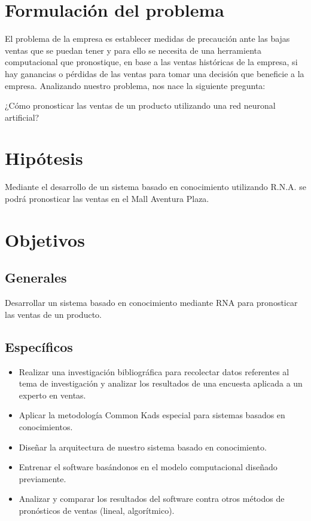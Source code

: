 \section{Formulación del problema}
El problema de la empresa es establecer medidas de precaución ante las bajas ventas que se puedan tener y para ello se necesita de una herramienta computacional que pronostique, en base a las ventas históricas de la empresa, si hay ganancias o pérdidas de las ventas para tomar una decisión que beneficie a la empresa. Analizando nuestro problema, nos nace la siguiente pregunta:
 
 \begin{center} 
     ¿Cómo pronosticar las ventas de un producto utilizando una red neuronal artificial?
 \end{center}

\section{Hipótesis}
Mediante el desarrollo de un sistema basado en conocimiento utilizando R.N.A. se podrá pronosticar las ventas en el Mall Aventura Plaza.




\section{Objetivos}
\subsection{Generales}
Desarrollar un sistema basado en conocimiento mediante RNA para pronosticar las ventas de un producto.
\subsection{Específicos}
\begin{itemize}
\item Realizar una investigación bibliográfica para recolectar datos referentes al tema de investigación y analizar los resultados de una encuesta aplicada a un experto en ventas.
\item Aplicar la metodología Common Kads especial para sistemas basados en conocimientos.
\item Diseñar la arquitectura de nuestro sistema basado en conocimiento.
\item Entrenar el software basándonos en el modelo computacional diseñado previamente.
\item Analizar y comparar los resultados del software contra otros métodos de pronósticos de ventas (lineal, algorítmico).
\end{itemize}

